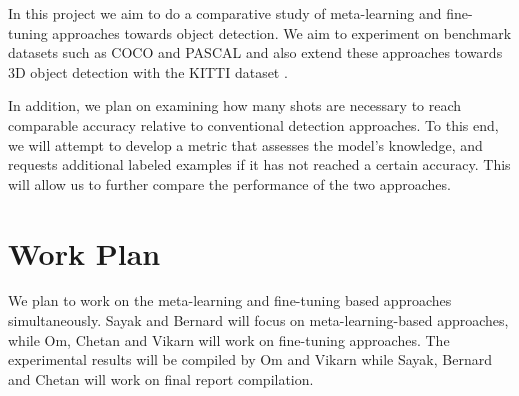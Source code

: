\documentclass{article}
\begin{document}
In this project we aim to do a comparative study of meta-learning and fine-tuning approaches 
towards object detection. We aim to experiment on benchmark datasets such as 
COCO \cite{LinMBHPRDZ14} and PASCAL \cite{Everingham10} and also extend these approaches 
towards 3D object detection with the KITTI dataset \cite{Geiger2013IJRR}.

In addition, we plan on examining how many shots are necessary to reach comparable accuracy relative to 
conventional detection approaches. To this end, we will attempt to develop a metric that assesses
the model's knowledge, and requests additional labeled examples if it has not reached a certain accuracy. 
This will allow us to further compare the performance of the two approaches. 

\section{Work Plan}

We plan to work on the meta-learning and fine-tuning based approaches simultaneously. 
Sayak and Bernard will focus on meta-learning-based approaches, while Om, Chetan and Vikarn will work 
on fine-tuning approaches. The experimental results will be compiled by Om and Vikarn while Sayak, 
Bernard and Chetan will work on final report compilation. 



























\end{document}
